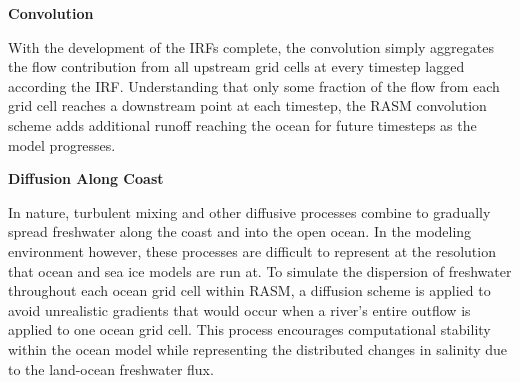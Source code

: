 \textbf{Convolution}

With the development of the IRFs complete, the convolution simply aggregates the flow contribution from all upstream grid cells at every timestep lagged according the IRF.
Understanding that only some fraction of the flow from each grid cell reaches a downstream point at each timestep, the RASM convolution scheme adds additional runoff reaching the ocean for future timesteps as the model progresses.

\textbf{Diffusion Along Coast}

In nature, turbulent mixing and other diffusive processes combine to gradually spread freshwater along the coast and into the open ocean.
In the modeling environment however, these processes are difficult to represent at the resolution that ocean and sea ice models are run at.
To simulate the dispersion of freshwater throughout each ocean grid cell within RASM, a diffusion scheme is applied to avoid unrealistic gradients that would occur when a river’s entire outflow is applied to one ocean grid cell.
This process encourages computational stability within the ocean model while representing the distributed changes in salinity due to the land-ocean freshwater flux.